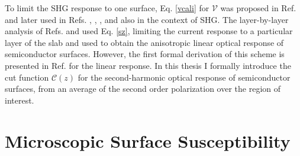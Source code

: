 To limit the SHG response to one surface, Eq. \eqref{vcali} for
$\boldsymbol{\mathcal{V}}$ was proposed in Ref. \cite{reiningPRB94} and later
used in Refs. \cite{mendozaPRL98}, \cite{mendozaPRB01}, \cite{sanoPRB02}, and
\cite{mejiaRMF04} also in the context of SHG. The layer-by-layer analysis of
Refs. \cite{hoganPRB03} and \cite{castilloPRB03} used Eq. \eqref{sz}, limiting
the current response to a particular layer of the slab and used to obtain the
anisotropic linear optical response of semiconductor surfaces. However, the
first formal derivation of this scheme is presented in Ref. \cite{mendozaPRB06}
for the linear response. In this thesis I formally introduce the cut function
$\boldsymbol{\mathcal{C}}(z)$ for the second-harmonic optical response of
semiconductor surfaces, from an average of the second order polarization over
the region of interest.



\section{Microscopic Surface Susceptibility}

